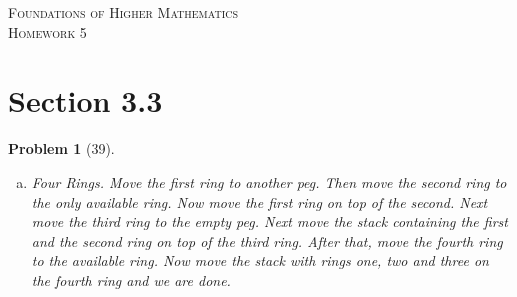 \documentclass{article}
\theoremstyle{problem}
\newtheorem{prob}{Problem}
\theoremstyle{plain}
\begin{document}
\begin{center}
\textsc{\Large Foundations of Higher Mathematics}\\[.3cm]
\textsc{\Large Homework 5}
\end{center}

\section*{Section 3.3}
\begin{prob}[39]\ \\[-1cm]
  \begin{enumerate}[a)]
    \item \textit{Four Rings.} Move the first ring to another peg. Then move the second ring to the only available ring. Now move the first ring on top of the second. Next move the third ring to the empty peg. Next move the stack containing the first and the second ring on top of the third ring. After that, move the fourth ring to the available ring. Now move the stack with rings one, two and three on the fourth ring and we are done.

\end{enumerate}
\end{prob}
\end{document}
